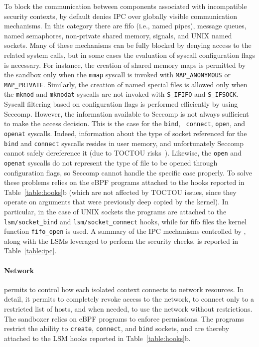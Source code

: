 To block the communication between components associated with
incompatible security contexts, \pap by default denies IPC over
globally visible communication mechanisms. In this category there are
fifo (i.e., named pipes), message queues, named semaphores,
non-private shared memory, signals, and UNIX named sockets.  Many of
these mechanisms can be fully blocked by denying access to the related
system calls, but in some cases the evaluation of syscall
configuration flags is necessary. For instance, the creation of shared
memory maps is permitted by the sandbox only when the {\tt mmap}
syscall is invoked with {\tt MAP\_ANONYMOUS} or {\tt
  MAP\_PRIVATE}. Similarly, the creation of named special files is
allowed only when the {\tt mknod} and {\tt mknodat} syscalls are not
invoked with {\tt S\_IFIFO} and {\tt S\_IFSOCK}. Syscall filtering
based on configuration flags is performed efficiently by \pap using
Seccomp.
However, the information available to Seccomp is not always sufficient
to make the access decision. This is the case for the {\tt bind}, {\tt
  connect}, {\tt open}, and {\tt openat} syscalls.  Indeed,
information about the type of socket referenced for the {\tt bind} and
{\tt connect} syscalls resides in user memory, and unfortunately
Seccomp cannot safely dereference it (due to
TOCTOU risks~\cite{seccomp-toctou}). Likewise, the {\tt open} and {\tt openat} syscalls do
not represent the type of file to be opened through configuration
flags, so Seccomp cannot handle the specific case properly. To solve
these problems \pap relies on the eBPF programs attached to the hooks
reported in Table~\ref{table:hooks}b (which are not affected by TOCTOU
issues, since they operate on arguments that were previously deep
  copied by the kernel). In particular, in the case of UNIX sockets the programs are
attached to the {\tt lsm/socket\_bind} and {\tt lsm/socket\_connect}
hooks, while for fifo files the kernel function {\tt fifo\_open} is
used. A summary of the IPC mechanisms controlled by \pap, along with
the LSMs leveraged to perform the security checks, is reported in
Table~\ref{table:ipc}.

\paragraph{Network}
%
\pap permits to control how each isolated context connects to network
resources. In detail, it permits to completely revoke access to the
network, to connect only to a restricted list of hosts, and when
needed, to use the network without restrictions. The sandboxer relies
on eBPF programs to enforce permissions. The programs restrict the
ability to {\tt create}, {\tt connect}, and {\tt bind} sockets, and
are thereby attached to the LSM hooks reported in
Table~\ref{table:hooks}b.

